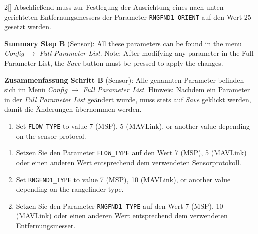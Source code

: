 \begin{paracol}{2}[]
Abschließend muss zur Festlegung der Ausrichtung eines nach unten gerichteten Entfernungsmessers der Parameter \texttt{RNGFND1\_ORIENT} auf den Wert 25 gesetzt werden.

\coleng

\textbf{Summary Step B} (Sensor): All these parameters can be found in the menu \textit{Config} \(\longrightarrow\) \textit{Full Parameter List}. Note: After modifying any parameter in the Full Parameter List, the \textit{Save} button must be pressed to apply the changes.

\colger

\textbf{Zusammenfassung Schritt B} (Sensor): Alle genannten Parameter befinden sich im Menü \textit{Config} \(\longrightarrow\) \textit{Full Parameter List}. Hinweis: Nachdem ein Parameter in der \textit{Full Parameter List} geändert wurde, muss stets auf \textit{Save} geklickt werden, damit die Änderungen übernommen werden.

\coleng

\begin{enumerate} 
  \item Set \texttt{FLOW\_TYPE} to value 7 (MSP), 5 (MAVLink), or another value depending on the sensor protocol.
\end{enumerate} 

\colger

\begin{enumerate}
  \item Setzen Sie den Parameter \texttt{FLOW\_TYPE} auf den Wert 7 (MSP), 5 (MAVLink) oder einen anderen Wert entsprechend dem verwendeten Sensorprotokoll.
\end{enumerate}

\coleng

\begin{enumerate} 
\setcounter{enumi}{1}
\item Set \texttt{RNGFND1\_TYPE} to value 7 (MSP), 10 (MAVLink), or another value depending on the rangefinder type.
\end{enumerate} 

\colger

\begin{enumerate}
\setcounter{enumi}{1}
\item Setzen Sie den Parameter \texttt{RNGFND1\_TYPE} auf den Wert 7 (MSP), 10 (MAVLink) oder einen anderen Wert entsprechend dem verwendeten Entfernungsmesser.
\end{enumerate}

\coleng


\end{paracol}
